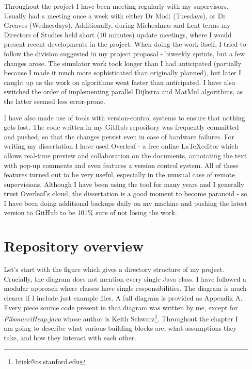 \documentclass[12pt,a4paper,twoside,openright]{report}
\begin{document}
Throughout the project I have been meeting regularly with my supervisors. Usually had a meeting once a week with either Dr Modi (Tuesdays), or Dr Greaves (Wednesdays). Additionally, during Michealmas and Lent terms my Directors of Studies held short ($10$ minutes) update meetings, where I would present recent developments in the project. When doing the work itself, I tried to follow the division suggested in my project proposal - biweekly sprints, but a few changes arose. The simulator work took longer than I had anticipated (partially because I made it much more sophisticated than originally planned), but later I caught up as the work on algorithms went faster than anticipated. I have also switched the order of implementing parallel Dijkstra and MatMul algorithms, as the latter seemed less  error-prone.  

I have also made use of tools with version-control systems to ensure that nothing gets lost. The code written in my GitHub repository was frequently committed and pushed, so that the changes persist even in case of hardware failures. For writing my dissertation I have used Overleaf - a free online \LaTeX editor which allows real-time preview and collaboration on the documents, annotating the text with pop-up comments and even features a version control system. All of these features turned out to be very useful, especially in the unusual case of remote supervisions. Although I have been using the tool for many years and I generally trust Overleaf's cloud, the dissertation is a good moment to become paranoid - so I have been doing additional backups daily on my machine and pushing the latest version to GitHub to be 101\% sure of not losing the work.

\section{Repository overview}
Let's start with the figure which gives a directory structure of my project. Crucially, the diagram does not mention every single Java class. I have followed a modular approach where classes have single responsibilities. The diagram is much clearer if I include just example files. A full diagram is provided as Appendix A. Every piece source code present in that diagram was written by me, except for \textit{FibonacciHeap.java} whose author is Keith Schwarz\footnote{htiek@cs.stanford.edu}. Throughout the chapter I am going to describe what various building blocks are, what assumptions they take, and how they interact with each other.
\end{document}
